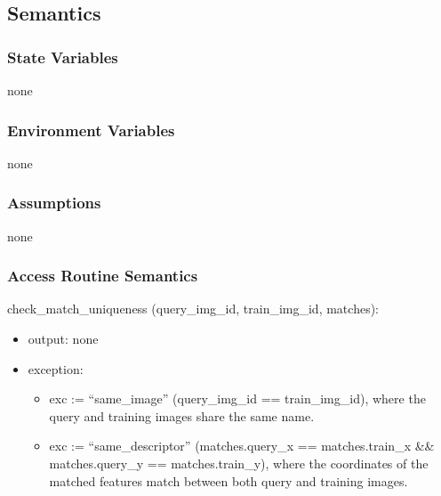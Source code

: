 \documentclass[12pt, titlepage]{article}
\begin{document}
\subsection{Semantics}

\subsubsection{State Variables}
none

\subsubsection{Environment Variables}
none


\subsubsection{Assumptions}
none

\subsubsection{Access Routine Semantics}

\noindent check\_match\_uniqueness (query\_img\_id, train\_img\_id, matches):
\begin{itemize}
  \item output: none 
  \item exception:
  \begin{itemize}
    \item exc := ``same\_image'' \textbar{} (query\_img\_id == train\_img\_id), where the query and training images share the same name.
    \item exc := ``same\_descriptor'' \textbar{} (matches.query\_x == matches.train\_x \&\& matches.query\_y == matches.train\_y), where the coordinates of the matched features match between both query and training images.
  \end{itemize}
\end{itemize}
\end{document}
